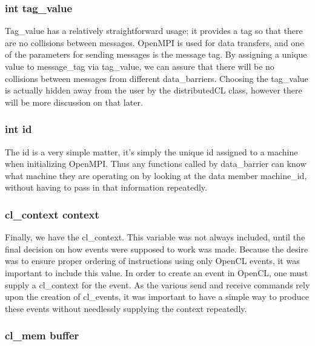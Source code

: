 \documentclass[../thesis.tex]{subfiles}
\begin{document}

  \subsubsection{int tag\_value} %
  \label{ssub:int_tag_value}
    Tag\_value has a relatively straightforward usage; it provides a tag so that there are no collisions between messages. OpenMPI is used for data transfers, and one of the parameters for sending messages is the message tag. By assigning a unique value to message\_tag via tag\_value, we can assure that there will be no collisions between messages from different data\_barriers. Choosing the tag\_value is actually hidden away from the user by the distributedCL class, however there will be more discussion on that later.

  \subsubsection{int id} %
  \label{ssub:int_id}
    The id is a very simple matter, it's simply the unique id assigned to a machine when initializing OpenMPI. Thus any functions called by data\_barrier can know what machine they are operating on by looking at the data member machine\_id, without having to pass in that information repeatedly.

  \subsubsection{cl\_context context} %
  \label{ssub:cl_context_context}
    Finally, we have the cl\_context. This variable was not always included, until the final decision on how events were supposed to work was made. Because the desire was to ensure proper ordering of instructions using only OpenCL events, it was important to include this value. In order to create an event in OpenCL, one must supply a cl\_context for the event. As the various send and receive commands rely upon the creation of cl\_events, it was important to have a simple way to produce these events without needlessly supplying the context repeatedly.

  \subsubsection{cl\_mem buffer} %
  \label{ssub:cl_mem_buffer} 
\end{document}
